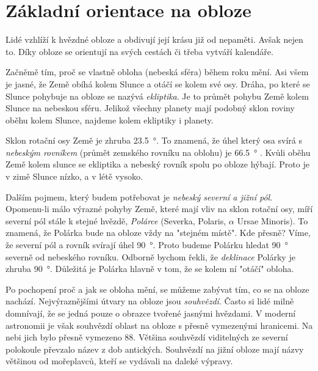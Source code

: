\documentclass[crop=false]{standalone}
\begin{document}
\section*{Základní orientace na obloze}

\quad

Lidé vzhlíží k hvězdné obloze a obdivují její krásu již od nepaměti.
Avšak nejen to.
Díky obloze se orientují na svých cestách či třeba vytváří kalendáře.

Začněmě tím, proč se vlastně obloha (nebeská sféra) během roku mění.
Asi všem je jasné, že Země obíhá kolem Slunce a otáčí se kolem své osy.
Dráha, po které se Slunce pohybuje na obloze se nazývá \textit{ekliptika}. Je to průmět pohybu Země kolem Slunce na nebeskou sféru.
Jelikož všechny planety mají podobný sklon roviny oběhu kolem Slunce, najdeme kolem ekliptiky i planety.

Sklon rotační osy Země je zhruba \qty{23,5}{\degree}.
To znamená, že úhel který osa svírá s \textit{nebeským rovníkem} (průmět zemského rovníku na oblohu) je \qty{66,5}{\degree} . 
Kvůli oběhu Země kolem slunce se ekliptika a nebeský rovník spolu po obloze hýbají.
Proto je v zimě Slunce nízko, a v létě vysoko.

Dalším pojmem, který budem potřebovat je \textit{nebeský severní a jižní pól}.
Opomenu-li málo výrazné pohyby Země, které mají vliv na sklon rotační osy, míří severní pól stále k stejné hvězdě, \textit{Polárce} (Severka, Polaris, $\alpha$ Ursae Minoris).
To znamená, že Polárka bude na obloze vždy na "stejném místě".
Kde přesně?
Víme, že severní pól a rovník svírají úhel \qty{90}{\degree}. Proto budeme Polárku hledat \qty{90}{\degree} severně od nebeského rovníku. 
Odborně bychom řekli, že \textit{deklinace} Polárky je zhruba \qty{90}{\degree}.
Důležitá je Polárka hlavně v tom, že se kolem ní "otáčí" obloha. 

Po pochopení proč a jak se obloha mění, se můžeme zabývat tím, co se na obloze nachází.
Nejvýraznějšími útvary na obloze jsou \textit{souhvězdí}.
Často si lidé milně domnívají, že se jedná pouze o obrazce tvořené jasnými hvězdami.
V moderní astronomii je však souhvězdí oblast na obloze s přesně vymezenými hranicemi.
Na nebi jich bylo přesně vymezeno 88. Většina souhvězdí  viditelných ze  severní polokoule převzalo název z dob antických.
Souhvězdí na jižní obloze mají názvy většinou od mořeplavců, kteří se vydávali na daleké výpravy.
\end{document}
